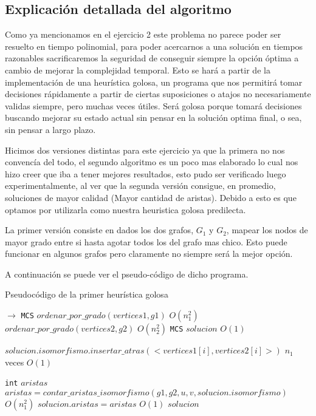 \subsection{Explicación detallada del algoritmo}

Como ya mencionamos en el ejercicio 2 este problema no parece poder ser resuelto en tiempo polinomial, para poder acercarnos a una solución en tiempos razonables sacrificaremos la seguridad de conseguir siempre la opción óptima a cambio de mejorar la complejidad temporal. Esto se hará a partir de la implementación de una heurística golosa, un programa que nos permitirá tomar decisiones rápidamente a partir de ciertas suposiciones o atajos no necesariamente validas siempre, pero muchas veces
útiles. Será golosa porque tomará decisiones buscando mejorar su estado actual sin pensar en la solución optima final, o sea, sin pensar a largo plazo.

Hicimos dos versiones distintas para este ejercicio ya que la primera no nos convencía del todo, el segundo algoritmo es un poco mas elaborado lo cual nos hizo creer que iba a tener mejores resultados, esto pudo ser verificado luego experimentalmente, al ver que la segunda versión consigue, en promedio, soluciones de mayor calidad (Mayor cantidad de aristas). Debido a esto es que optamos por utilizarla como nuestra heuristica golosa predilecta.

La primer versión consiste en dados los dos grafos, $G_1$ y $G_2$, mapear los nodos de mayor grado entre si hasta agotar todos los del grafo mas chico. Esto puede funcionar en algunos grafos pero claramente no siempre será la mejor opción. 

A continuación se puede ver el pseudo-código de dicho programa.

\begin{algorithm}[H]
  \begin{algorithmic}[1]
  \caption{Pseudocódigo de la primer heurística golosa}
  \label{algo:4-1}
     $\to$ \texttt{MCS}
      \State $ordenar\_por\_grado(vertices1, g1)$ 
        \Comment $O(n_1^2)$ 
      \State $ordenar\_por\_grado(vertices2, g2)$ 
        \Comment $O(n_2^2)$ 
      \State \texttt{MCS} $solucion$ 
        \Comment $O(1)$ 

	  \State  $solucion.isomorfismo.insertar\_atras(<vertices1[i],vertices2[i]>)$
      \Comment $n_1$ veces $O(1)$
    	  \EndFor

	  \State \texttt{int} $aristas$
	  \State $ aristas = contar\_aristas\_isomorfismo(g1,g2,u,v, solucion.isomorfismo)$
      \Comment $O(n_1^2)$
	  \State $solucion.aristas = aristas$
	  \Comment $O(1)$
      \State \Return $solucion$
      \EndProcedure
	\end{algorithmic}
\end{algorithm}


